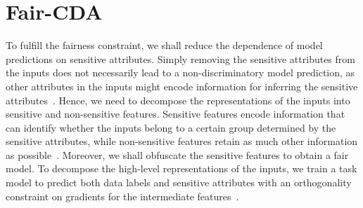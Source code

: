 \documentclass[letterpaper]{article} %
\begin{document}
\section{Fair-CDA}


To fulfill the fairness constraint, we shall reduce the dependence of model predictions on sensitive attributes.
Simply removing the sensitive attributes from the inputs does not necessarily lead to a non-discriminatory model prediction, as other attributes in the inputs might encode information for inferring the sensitive attributes~\cite{dwork2011fairness,feldman2015certifying}. Hence, we need to decompose the representations of the inputs into sensitive and non-sensitive features. Sensitive features encode information that can identify whether the inputs belong to a certain group determined by the sensitive attributes, while non-sensitive features retain as much other information as possible~\cite{Zemellearningfair}. Moreover, we shall obfuscate the sensitive features to obtain a fair model. To decompose the high-level representations of the inputs, we train a task model to predict both data labels and sensitive attributes with an orthogonality constraint on gradients for the intermediate features~\cite{bai2020decaug}.
\end{document}
